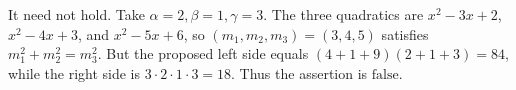 It need not hold. Take $\alpha=2,\beta=1,\gamma=3$. The three quadratics are $x^2-3x+2$, $x^2-4x+3$, and $x^2-5x+6$, so $(m_1,m_2,m_3)=(3,4,5)$ satisfies $m_1^2+m_2^2=m_3^2$. But the proposed left side equals $(4+1+9)(2+1+3)=84$, while the right side is $3\cdot2\cdot1\cdot3=18$. Thus the assertion is $\boxed{\text{false}}$.
